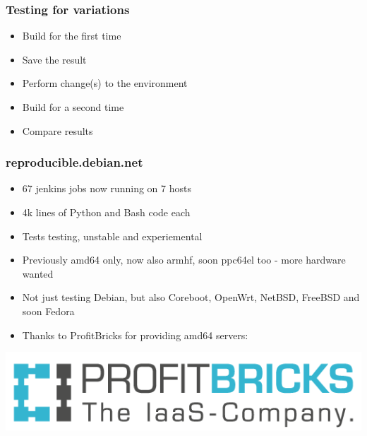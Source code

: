 \documentclass[14pt,aspectratio=169]{beamer}
\begin{document}
\begin{frame}
 \frametitle{Testing for variations}

 \begin{itemize}
  \item Build for the first time
  \item Save the result
  \item Perform change(s) to the environment
  \item Build for a second time
  \item Compare results
 \end{itemize}
\end{frame}

\begin{frame}
 \frametitle{reproducible.debian.net}

 \begin{itemize}
  \item 67 jenkins jobs now running on 7 hosts
  \item 4k lines of Python and Bash code each
  \item Tests testing, unstable and experiemental
  \item Previously amd64 only, now also armhf, soon ppc64el too - more hardware wanted
  \item Not just testing Debian, but also Coreboot, OpenWrt, NetBSD, FreeBSD and soon Fedora
  \item Thanks to ProfitBricks for providing amd64 servers:
 \end{itemize}
 \vfill
 \begin{center}
 \includegraphics[height=0.15\paperheight]{images/profitbricks_logo.png}
 \end{center}
\end{frame}
\end{document}
